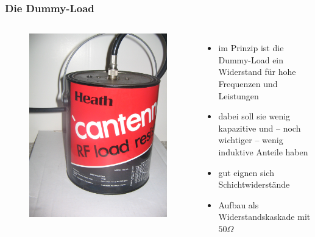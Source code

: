 \begin{frame}
  \frametitle{Die Dummy-Load}
  \begin{columns}
    \begin{figure}
      \includegraphics[width=\textwidth,height=.7\textheight,keepaspectratio]{a17/Cantenna.jpg}
    \end{figure}
    \begin{itemize}
      \item im Prinzip ist die Dummy-Load ein Widerstand für hohe Frequenzen und Leistungen
      \item dabei soll sie wenig kapazitive und -- noch wichtiger -- wenig induktive Anteile haben
      \item gut eignen sich Schichtwiderstände
      \item Aufbau als Widerstandskaskade mit $50\Omega$
    \end{itemize}
  \end{columns}
\end{frame}


